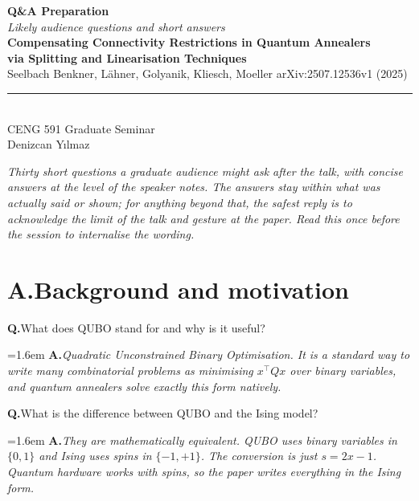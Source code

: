\documentclass[11pt,a4paper]{article}
\newcounter{qanda}
\newcommand{\qa}[2]{%
  \stepcounter{qanda}%
  \par\noindent
  \textbf{\color{accent}Q\arabic{qanda}.}\;#1\par\smallskip
  \hangindent=1.6em\hangafter=0
  \textbf{A.}\;\textit{#2}\par\medskip
}
\begin{document}
\begin{center}
\vspace*{1.2cm}
{\LARGE\bfseries\color{accent} Q\&A Preparation}\\[0.4em]
{\large\itshape Likely audience questions and short answers}\\[1.6em]
{\large\bfseries Compensating Connectivity Restrictions in Quantum Annealers}\\
{\large\bfseries via Splitting and Linearisation Techniques}\\[0.4em]
{\normalsize Seelbach Benkner, L\"ahner, Golyanik, Kliesch, Moeller \quad arXiv:2507.12536v1 (2025)}\\[1.4em]
\rule{0.5\linewidth}{0.4pt}\\[0.6em]
{\normalsize CENG 591 Graduate Seminar}\\
{\normalsize Denizcan Y\i lmaz }\\[1.4em]
\begin{minipage}{0.85\linewidth}
\small\itshape\color{muted}
Thirty short questions a graduate audience might ask after the talk, with concise answers at the level of the speaker notes. The answers stay within what was actually said or shown; for anything beyond that, the safest reply is to acknowledge the limit of the talk and gesture at the paper. Read this once before the session to internalise the wording.
\end{minipage}
\end{center}

\vspace*{\fill}

\newpage

\section*{A.\quad Background and motivation}

\qa{What does QUBO stand for and why is it useful?}{Quadratic Unconstrained Binary Optimisation. It is a standard way to write many combinatorial problems as minimising $x^\top Q x$ over binary variables, and quantum annealers solve exactly this form natively.}

\qa{What is the difference between QUBO and the Ising model?}{They are mathematically equivalent. QUBO uses binary variables in $\{0,1\}$ and Ising uses spins in $\{-1,+1\}$. The conversion is just $s = 2x - 1$. Quantum hardware works with spins, so the paper writes everything in the Ising form.}
\end{document}
